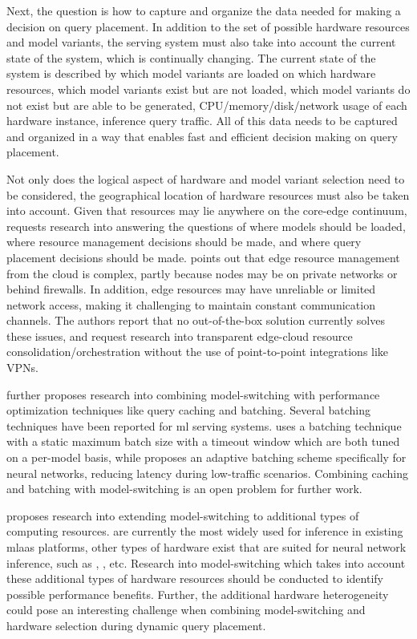 Next, the question is how to capture and organize the data needed for making a decision on query placement.
In addition to the set of possible hardware resources and model variants, the serving system must also take into account the current state of the system, which is continually changing.
The current state of the system is described by which model variants are loaded on which hardware resources, which model variants exist but are not loaded, which model variants do not exist but are able to be generated, CPU/memory/disk/network usage of each hardware instance, inference query traffic.
All of this data needs to be captured and organized in a way that enables fast and efficient decision making on query placement.

Not only does the logical aspect of hardware and model variant selection need to be considered, the geographical location of hardware resources must also be taken into account.
Given that resources may lie anywhere on the core-edge continuum, \cite{Yadwadkar2019} requests research into answering the questions of where models should be loaded, where resource management decisions should be made, and where query placement decisions should be made.
\cite{Rausch2019a} points out that edge resource management from the cloud is complex, partly because nodes may be on private networks or behind firewalls.
In addition, edge resources may have unreliable or limited network access, making it challenging to maintain constant communication channels.
The authors report that no out-of-the-box solution currently solves these issues, and request research into transparent edge-cloud resource consolidation/orchestration without the use of point-to-point integrations like VPNs.

\cite{Zhang2020} further proposes research into combining model-switching with performance optimization techniques like query caching and batching.
Several batching techniques have been reported for \acrshort{ml} serving systems.
\cite{Crankshaw2017} uses a batching technique with a static maximum batch size with a timeout window which are both tuned on a per-model basis, while \cite{Choi2021} proposes an adaptive batching scheme specifically for neural networks, reducing latency during low-traffic scenarios.
Combining caching and batching with model-switching is an open problem for further work.

\cite{Zhang2020} proposes research into extending model-switching to additional types of computing resources.
 are currently the most widely used for inference in existing \acrfull{mlaas} platforms, other types of hardware exist that are suited for neural network inference, such as , , etc.
Research into model-switching which takes into account these additional types of hardware resources should be conducted to identify possible performance benefits.
Further, the additional hardware heterogeneity could pose an interesting challenge when combining model-switching and hardware selection during dynamic query placement.


